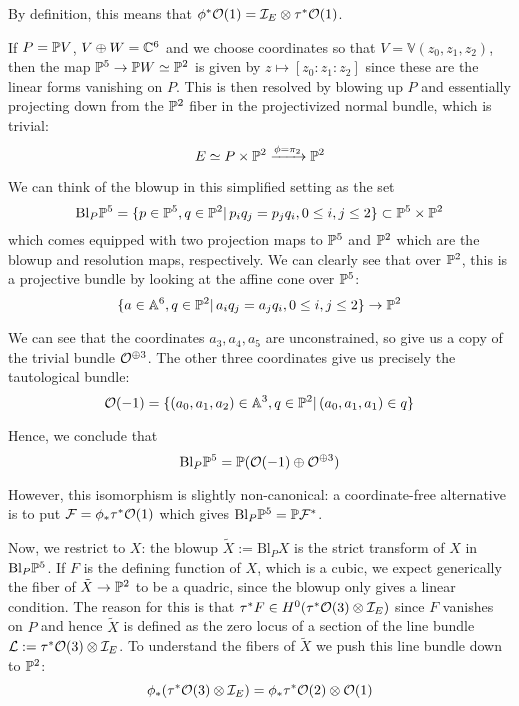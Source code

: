 \begin{center}
\end{center}

By definition, this means that $\phi^* \O(1)=\calI_E \otimes \tau^*\O(1)$.

If $P=\P V$, $V\oplus W =\C^6$ and we choose coordinates so that $V=\mathbb{V}(z_0,z_1,z_2)$, then the map $\P^5\rightarrow \P W\simeq \P^2$ is given by $z \mapsto [z_0:z_1:z_2]$ since these are the linear forms vanishing on $P$. This is then resolved by blowing up $P$ and essentially projecting down from the $\P^2$ fiber in the projectivized normal bundle, which is trivial:  $$E \simeq P \times \P^2 \xrightarrow{\phi = \pi_2} \P^2$$

We can think of the blowup in this simplified setting as the set $$\mathrm{Bl}_P \P^5 = \{p\in \P^5, q\in \P^2 |\, p_iq_j=p_jq_i, 0\leq i,j \leq 2\} \subset \P^5 \times \P^2$$
which comes equipped with two projection maps to $\P^5$ and $\P^2$ which are the blowup and resolution maps, respectively. We can clearly see that over $\P^2$, this is a projective bundle by looking at the affine cone over $\P^5$: $$\{ a\in \A^6, q\in \P^2|\,a_iq_j=a_jq_i, 0\leq i,j \leq 2\}\rightarrow \P^2$$

We can see that the coordinates $a_3, a_4, a_5$ are unconstrained, so give us a copy of the trivial bundle $\O^{\oplus 3}$. The other three coordinates give us precisely the tautological bundle: $$\O(-1)=\{(a_0,a_1,a_2)\in \A^3, q\in \P^2|\, (a_0, a_1, a_1)\in q\}$$

Hence, we conclude that $$\mathrm{Bl}_P \P^5 = \P (\O(-1)\oplus \O^{\oplus 3})$$

However, this isomorphism is slightly non-canonical: a coordinate-free alternative is to put $\calF = \phi_* \tau^* \O(1)$ which gives $\mathrm{Bl}_P \P^5 = \P \calF^*$.

Now, we restrict to $X$: the blowup $\tilde{X}:=\mathrm{Bl}_P X$ is the strict transform of $X$ in $\mathrm{Bl}_P \P^5$. If $F$ is the defining function of $X$, which is a cubic, we expect generically the fiber of $\tilde{X}\rightarrow \P^2$ to be a quadric, since the blowup only gives a linear condition. The reason for this is that $\tau^*F \in H^0(\tau^* \O(3) \otimes \calI_E)$ since $F$ vanishes on $P$ and hence $\tilde{X}$ is defined as the zero locus of a section of the line bundle $\calL := \tau^* \O(3) \otimes \calI_E$. To understand the fibers of $\tilde{X}$ we push this line bundle down to $\P^2$: $$\phi_*(\tau^* \O(3) \otimes \calI_E)=\phi_* \tau^* \O(2) \otimes \O(1)$$

